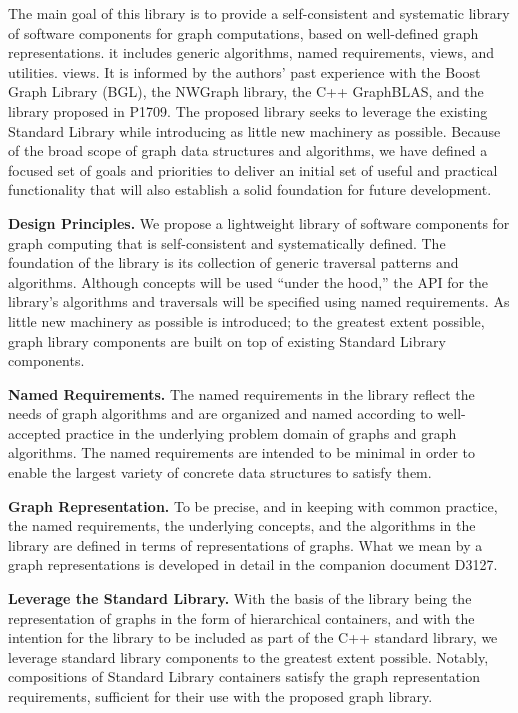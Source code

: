 The main goal of this library is to provide a self-consistent and systematic library of software components for
graph computations, based on well-defined graph representations. it includes generic 
algorithms, named requirements, views, and utilities.
views.  
%
It is informed by the authors' past experience with the Boost Graph Library (BGL), the NWGraph library, the C++
GraphBLAS, and the library proposed in P1709.  The proposed library seeks to leverage the existing Standard
Library while introducing as little new machinery as possible.
%
Because of the broad scope of graph data structures and algorithms, we have defined a focused set of goals and
priorities to deliver an initial set of useful and practical functionality that will also establish a solid
foundation for future development.


\textbf{Design Principles.}  We propose a lightweight library of software components for graph computing that is
self-consistent and systematically defined.  The foundation of the library is its collection of generic traversal
patterns and algorithms.  Although concepts will be used ``under the hood,'' the API for the library's
algorithms and traversals will be specified using named requirements.  As little new machinery as possible is
introduced; to the greatest extent possible, graph library components are built on top of existing Standard
Library components.

\textbf{Named Requirements.}  The named requirements in the library reflect the needs of graph algorithms and
are organized and named according to well-accepted practice in the underlying problem domain of graphs and graph
algorithms.  The named requirements are intended to be minimal in order to enable the largest variety of
concrete data structures to satisfy them.

\textbf{Graph Representation.}  To be precise, and in keeping with common practice, the named requirements, the
underlying concepts, and the algorithms in the library are defined in terms of representations of graphs.  
What we mean by a graph representations is developed in detail in the companion document D3127.

\textbf{Leverage the Standard Library.}
With the basis of the library being the representation of graphs in the form of hierarchical containers, and
with the intention for the library to be included as part of the C++ standard library, we leverage standard
library components to the greatest extent possible.  Notably, compositions of Standard Library containers
satisfy the graph representation requirements, sufficient for their use with the proposed graph library.

